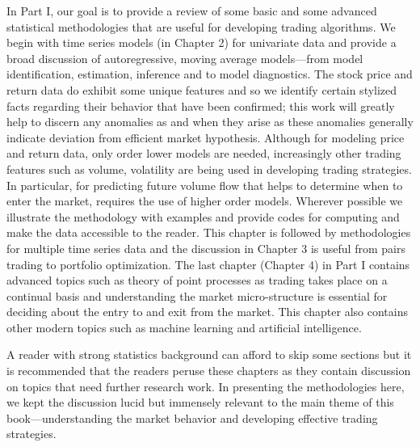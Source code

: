 
In Part I, our goal is to provide a review of some basic and some advanced statistical methodologies that are useful for developing trading algorithms. We begin with time series models (in Chapter 2) for univariate data and provide a broad discussion of autoregressive, moving average models---from model identification, estimation, inference and to model diagnostics. The stock price and return data do exhibit some unique features and so we identify certain stylized facts regarding their behavior that have been confirmed; this work will greatly help to discern any anomalies as and when they arise as these anomalies generally indicate deviation from efficient market hypothesis. Although for modeling price and return data, only order lower models are needed, increasingly other trading features such as volume, volatility are being used in developing trading strategies. In particular, for predicting future volume flow that helps to determine when to enter the market, requires the use of higher order models. Wherever possible we illustrate the methodology with examples and provide codes for computing and make the data accessible to the reader. This chapter is followed by methodologies for multiple time series data and the discussion in Chapter 3 is useful from pairs trading to portfolio optimization. The last chapter (Chapter 4) in Part I contains advanced topics such as theory of point processes as trading takes place on a continual basis and understanding the market micro-structure is essential for deciding about the entry to and exit from the market. This chapter also contains other modern topics such as machine learning and artificial intelligence. 


A reader with strong statistics background can afford to skip some sections but it is recommended that the readers peruse these chapters as they contain discussion on topics that need further research work. In presenting the methodologies here, we kept the discussion lucid but immensely relevant to the main theme of this book---understanding the market behavior and developing effective trading strategies. 








